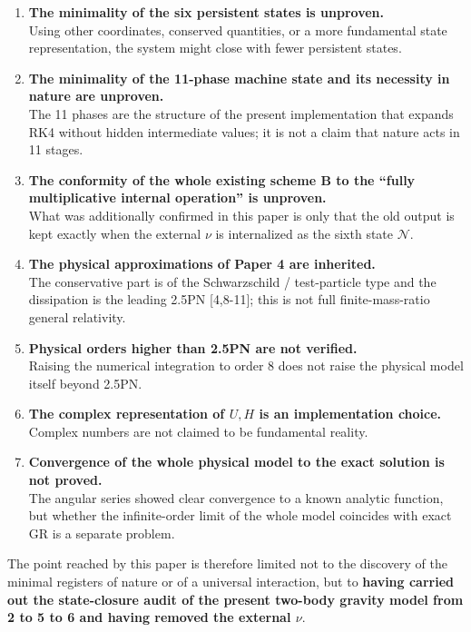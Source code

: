 \documentclass[
  a4paper,
]{article}
\begin{document}
\begin{enumerate}
\def\labelenumi{\arabic{enumi}.}
\item
  \textbf{The minimality of the six persistent states is unproven.}\\
  Using other coordinates, conserved quantities, or a more fundamental
  state representation, the system might close with fewer persistent
  states.
\item
  \textbf{The minimality of the 11-phase machine state and its necessity
  in nature are unproven.}\\
  The 11 phases are the structure of the present implementation that
  expands RK4 without hidden intermediate values; it is not a claim that
  nature acts in 11 stages.
\item
  \textbf{The conformity of the whole existing scheme B to the ``fully
  multiplicative internal operation'' is unproven.}\\
  What was additionally confirmed in this paper is only that the old
  output is kept exactly when the external \(\nu\) is internalized as
  the sixth state \(\mathcal N\).
\item
  \textbf{The physical approximations of Paper 4 are inherited.}\\
  The conservative part is of the Schwarzschild / test-particle type and
  the dissipation is the leading 2.5PN {[}4,8-11{]}; this is not full
  finite-mass-ratio general relativity.
\item
  \textbf{Physical orders higher than 2.5PN are not verified.}\\
  Raising the numerical integration to order 8 does not raise the
  physical model itself beyond 2.5PN.
\item
  \textbf{The complex representation of \(U,H\) is an implementation
  choice.}\\
  Complex numbers are not claimed to be fundamental reality.
\item
  \textbf{Convergence of the whole physical model to the exact solution
  is not proved.}\\
  The angular series showed clear convergence to a known analytic
  function, but whether the infinite-order limit of the whole model
  coincides with exact GR is a separate problem.
\end{enumerate}

The point reached by this paper is therefore limited not to the
discovery of the minimal registers of nature or of a universal
interaction, but to \textbf{having carried out the state-closure audit
of the present two-body gravity model from 2 to 5 to 6 and having
removed the external \(\nu\)}.
\end{document}
